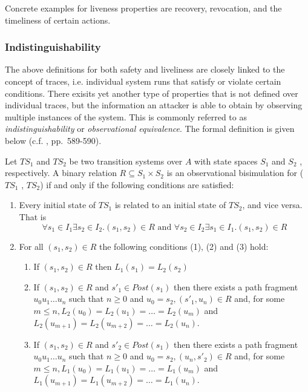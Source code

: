 Concrete examples for liveness properties are recovery, revocation, and the timeliness of certain actions.

\subsubsection{Indistinguishability}

The above definitions for both safety and liveliness are closely linked to the concept of traces, i.e. individual system runs that satisfy or violate certain conditions.
There exisits yet another type of properties that is not defined over individual traces, but the information an attacker is able to obtain by observing multiple instances of the system.
This is commonly referred to as \textit{indistinguishability} or \textit{observational equivalence}.
The formal definition is given below (c.f. \cite{baier2008principles}, pp.~589-590).

Let $TS_1$ and $TS_2$ be two transition systems over $A$ with state spaces $S_1$ and $S_2$ , respectively.
A binary relation $R \subseteq S_1 \times S_2$ is an
observational bisimulation for ($TS_1$ , $TS_2$) if and only if the following conditions are satisfied:

\begin{enumerate}[label=(\Alph*)]
    \item Every initial state of $TS_1$ is related to an initial state of $TS_2$, and vice versa. That is
    \begin{equation*}
        \forall s_1 \in I_1 \exists s_2 \in I_2. (s_1, s_2) \in R \text{ and } \forall s_2 \in I_2 \exists s_1 \in I_1. (s_1, s_2) \in R
    \end{equation*}
    \item For all $(s_1, s_2) \in R$ the following conditions (1), (2) and (3) hold:
    \begin{enumerate}[label=(\arabic*)]
        \item If $(s_1, s_2) \in R$ then $L_1 (s_1) = L_2 (s_2)$
        \item If $(s_1, s_2) \in R$ and $s'_1 \in Post(s_1)$ then there exists a path fragment $u_0 u_1 \ldots u_n$ such that $n \geq 0$ and $u_0 = s_2, (s'_1, u_n) \in R$ and, for some $m \leq n, L_2(u_0) = L_2(u_1) = \ldots = L_2(u_m)$ and $L_2(u_{m+1}) = L_2(u_{m+2}) = \ldots = L_2(u_n)$.
        \item If $(s_1, s_2) \in R$ and $s'_2 \in Post(s_1)$ then there exists a path fragment $u_0 u_1 \ldots u_n$ such that $n \geq 0$ and $u_0 = s_2, (u_n, s'_2) \in R$ and, for some $m \leq n, L_1(u_0) = L_1(u_1) = \ldots = L_1 (u_m )$
and $L_1(u_{m+1}) = L_1(u_{m+2}) = \ldots = L_1 (u_n)$.
    \end{enumerate}
\end{enumerate}

